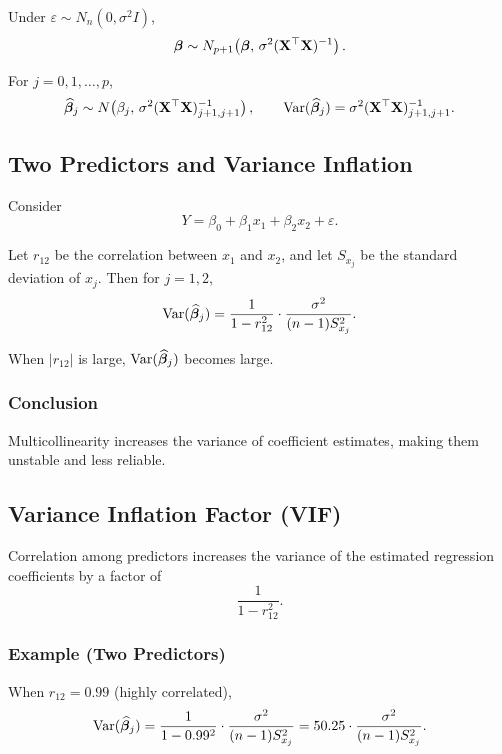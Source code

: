 Under $\varepsilon \sim N_n(0,\sigma^2 I)$,
\[
\boldsymbol{\beta} \sim N_{p+1}\!\left(\boldsymbol{\beta},\, \sigma^2 (\mathbf{X}^\top \mathbf{X})^{-1}\right).
\]

For $j = 0,1,\dots,p$,
\[
\widehat{\boldsymbol{\beta}}_j \sim N\!\left(\beta_j,\, \sigma^2 (\mathbf{X}^\top \mathbf{X})^{-1}_{j+1,j+1}\right),
\qquad
\operatorname{Var}(\widehat{\boldsymbol{\beta}}_j) = \sigma^2 (\mathbf{X}^\top \mathbf{X})^{-1}_{j+1,j+1}.
\]

\begin{caution}
\end{caution}

\subsection{Two Predictors and Variance Inflation}

Consider
\[
Y = \beta_0 + \beta_1 x_1 + \beta_2 x_2 + \varepsilon.
\]

Let $r_{12}$ be the correlation between $x_1$ and $x_2$, and let $S_{x_j}$ be the standard deviation of $x_j$. Then for $j=1,2$,
\[
\operatorname{Var}(\widehat{\boldsymbol{\beta}}_j)
= \frac{1}{1 - r_{12}^2}\cdot \frac{\sigma^2}{(n-1) S_{x_j}^2}.
\]

When $|r_{12}|$ is large, $\operatorname{Var}(\widehat{\boldsymbol{\beta}}_j)$ becomes large.

\subsubsection{Conclusion}

Multicollinearity increases the variance of coefficient estimates, making them unstable and less reliable.

\subsection{Variance Inflation Factor (VIF)}

Correlation among predictors increases the variance of the estimated regression coefficients by a factor of
\[
\frac{1}{1 - r_{12}^2}.
\]

\subsubsection{Example (Two Predictors)}

When $r_{12} = 0.99$ (highly correlated),
\[
\operatorname{Var}(\widehat{\boldsymbol{\beta}}_j)
= \frac{1}{1 - 0.99^2}\cdot \frac{\sigma^2}{(n-1)S_{x_j}^2}
= 50.25 \cdot \frac{\sigma^2}{(n-1)S_{x_j}^2}.
\]

